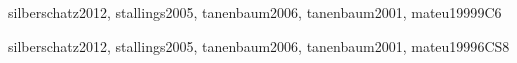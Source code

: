 \begin{syllabus}
\begin{unit}{\OSConcurrency}{}{silberschatz2012, stallings2005, tanenbaum2006, tanenbaum2001, mateu1999}{9}{C6}
\begin{topics}%
      \item \OSConcurrencyTopicStates
      \item \OSConcurrencyTopicStructures
      \item \OSConcurrencyTopicDispatching
      \item \OSConcurrencyTopicTheRole
      \item \OSConcurrencyTopicManaging
      \item \OSConcurrencyTopicImplementing
      \item \OSConcurrencyTopicMultiprocessor
\end{topics}
\begin{learningoutcomes}
	\item \OSConcurrencyLODescribeTheConcurrency [\Familiarity]
	\item \OSConcurrencyLODemonstrateTheTime [\Usage]
	\item \OSConcurrencyLOSummarizeTheMechanisms [\Familiarity]
	\item \OSConcurrencyLOExplainTheThat [\Familiarity]
	\item \OSConcurrencyLOSummarizeTechniques [\Familiarity]
	\item \OSConcurrencyLODescribeReasons [\Familiarity]
	\item \OSConcurrencyLOCreateState [\Usage]
\end{learningoutcomes}
\end{unit}

\begin{unit}{\OSSchedulingandDispatch}{}{silberschatz2012, stallings2005, tanenbaum2006, tanenbaum2001, mateu1999}{6}{CS8}
\begin{topics}%
      \item \OSSchedulingandDispatchTopicPreemptive
      \item \OSSchedulingandDispatchTopicSchedulers
      \item \OSSchedulingandDispatchTopicProcesses
      \item \OSSchedulingandDispatchTopicDeadlines
\end{topics}
\begin{learningoutcomes}
	\item \OSSchedulingandDispatchLOCompareAndCommon  [\Assessment]
	\item \OSSchedulingandDispatchLODescribeRelationships [\Familiarity]
	\item \OSSchedulingandDispatchLODiscussTheProcessor [\Familiarity]
	\item \OSSchedulingandDispatchLODescribeTheProcesses [\Familiarity]
	\item \OSSchedulingandDispatchLOCompareAndAndTo  [\Assessment]
	\item \OSSchedulingandDispatchLODiscussThePreemption [\Familiarity]
	\item \OSSchedulingandDispatchLOIdentifyWays [\Familiarity]
\end{learningoutcomes}
\end{unit}


\end{syllabus}
